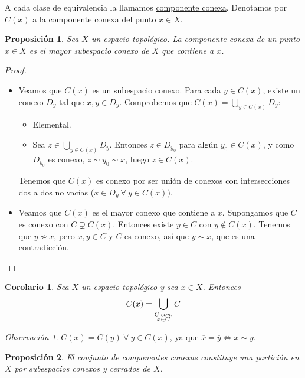 \documentclass[12pt]{report}
\newtheorem{proposition}{Proposición}[chapter]
\newtheorem{corollary}{Corolario}[chapter]
\theoremstyle{definition}
\theoremstyle{definition}
\theoremstyle{remark}
\newtheorem*{obs}{Observación} %
\begin{document}
A cada clase de equivalencia la llamamos \underline{componente conexa}. Denotamos por $C(x)$ a la componente conexa del punto $x \in X$.

\begin{proposition}
\label{prop2.4.}
Sea $X$ un espacio topológico. La componente conexa de un punto $x \in X$ es el mayor subespacio conexo de $X$ que contiene a $x$.
\end{proposition}

\begin{proof}
\hfill
\begin{itemize}
    \item Veamos que $C(x)$ es un subespacio conexo. Para cada $y \in C(x)$, existe un conexo $D_y$ tal que $x,y \in D_y$. Comprobemos que $C(x) = \bigcup_{y \in C(x)}D_y$:
    \begin{itemize}
        \item[{\fbox[rb]{$\subset$}}] Elemental.
        \item[{\fbox[rb]{$\supset$}}] Sea $z \in \bigcup_{y \in C(x)}D_y$. Entonces $z \in D_{y_0}$ para algún $y_0 \in C(x)$, y como $D_{y_0}$ es conexo, $z \sim y_0 \sim x$, luego $z \in C(x)$.
    \end{itemize}
    Tenemos que $C(x)$ es conexo por ser unión de conexos con intersecciones dos a dos no vacías ($x \in D_y \ \forall \ y \in C(x)$).
    \item Veamos que $C(x)$ es el mayor conexo que contiene a $x$. Supongamos que $C$ es conexo con $C \supsetneq C(x)$. Entonces existe $y \in C$ con $y \notin C(x)$. Tenemos que $y \nsim x$, pero $x,y \in C$ y $C$ es conexo, así que $y \sim x$, que es una contradicción.
\end{itemize}
\end{proof}

\begin{corollary}
Sea $X$ un espacio topológico y sea $x \in X$. Entonces \[C(x) = \bigcup_{\substack{C \, \emph{con.} \\ x \in C}}C\]
\end{corollary}

\begin{obs}
$C(x) = C(y) \ \forall \ y \in C(x)$, ya que $\overline{x} = \overline{y} \iff x \sim y$.
\end{obs}

\begin{proposition}
\label{prop2.5.}
El conjunto de componentes conexas constituye una partición en $X$ por subespacios conexos y cerrados de $X$.
\end{proposition}
\end{document}
